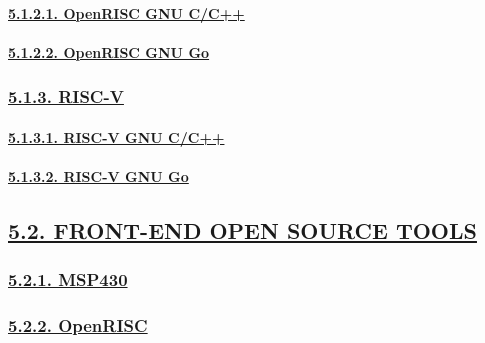 \documentclass[
]{article}
\begin{document}
\hypertarget{openrisc-gnu-cc}{%
\paragraph{\texorpdfstring{\protect\hyperlink{openrisc-gnu-cc-1}{5.1.2.1.
OpenRISC GNU
C/C++}}{5.1.2.1. OpenRISC GNU C/C++}}\label{openrisc-gnu-cc}}

\hypertarget{openrisc-gnu-go}{%
\paragraph{\texorpdfstring{\protect\hyperlink{openrisc-gnu-go-1}{5.1.2.2.
OpenRISC GNU Go}}{5.1.2.2. OpenRISC GNU Go}}\label{openrisc-gnu-go}}

\hypertarget{risc-v-1}{%
\subsubsection{\texorpdfstring{\protect\hyperlink{risc-v-4}{5.1.3.
RISC-V}}{5.1.3. RISC-V}}\label{risc-v-1}}

\hypertarget{risc-v-gnu-cc}{%
\paragraph{\texorpdfstring{\protect\hyperlink{risc-v-gnu-cc-1}{5.1.3.1.
RISC-V GNU C/C++}}{5.1.3.1. RISC-V GNU C/C++}}\label{risc-v-gnu-cc}}

\hypertarget{risc-v-gnu-go}{%
\paragraph{\texorpdfstring{\protect\hyperlink{risc-v-gnu-go-1}{5.1.3.2.
RISC-V GNU Go}}{5.1.3.2. RISC-V GNU Go}}\label{risc-v-gnu-go}}

\hypertarget{front-end-open-source-tools-1}{%
\subsection{\texorpdfstring{\protect\hyperlink{front-end-open-source-tools-3}{5.2.
FRONT-END OPEN SOURCE
TOOLS}}{5.2. FRONT-END OPEN SOURCE TOOLS}}\label{front-end-open-source-tools-1}}

\hypertarget{msp430-2}{%
\subsubsection{\texorpdfstring{\protect\hyperlink{msp430-5}{5.2.1.
MSP430}}{5.2.1. MSP430}}\label{msp430-2}}

\hypertarget{openrisc-2}{%
\subsubsection{\texorpdfstring{\protect\hyperlink{openrisc-5}{5.2.2.
OpenRISC}}{5.2.2. OpenRISC}}\label{openrisc-2}}
\end{document}
